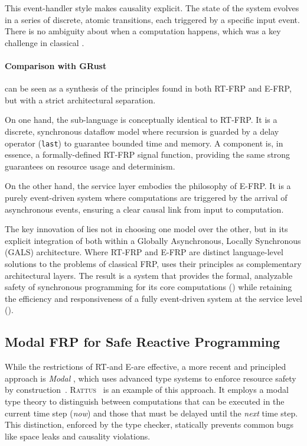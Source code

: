 This event-handler style makes causality explicit. The state of the system evolves in a series of
discrete, atomic transitions, each triggered by a specific input event. There is no ambiguity about
when a computation happens, which was a key challenge in classical \frp.

\paragraph*{Comparison with GRust}
\GRust can be seen as a synthesis of the principles found in both RT-FRP and E-FRP, but with a
strict architectural separation.

On one hand, the \GRSync sub-language is conceptually identical to RT-FRP. It is a discrete, synchronous
dataflow model where recursion is guarded by a delay operator (\texttt{last}) to guarantee bounded
time and memory. A \GRSync component is, in essence, a formally-defined RT-FRP signal function,
providing the same strong guarantees on resource usage and determinism.

On the other hand, the \GRFRP service layer embodies the philosophy of E-FRP. It is a purely
event-driven system where computations are triggered by the arrival of asynchronous events, ensuring
a clear causal link from input to computation.

The key innovation of \GRust lies not in choosing one model over the other, but in its explicit
integration of both within a Globally Asynchronous, Locally Synchronous (GALS) architecture. Where
RT-FRP and E-FRP are distinct language-level solutions to the problems of classical FRP, \GRust uses
their principles as complementary architectural layers. The result is a system that provides the
formal, analyzable safety of synchronous programming for its core computations (\GRSync) while
retaining the efficiency and responsiveness of a fully event-driven system at the service level
(\GRFRP).

\subsection{Modal FRP for Safe Reactive Programming}
\label{sec:sota:frp:modal}

While the restrictions of RT-\frp and E-\frp are effective, a more recent and principled approach is
\emph{Modal \frp}, which uses advanced type systems to enforce resource safety by
construction~\cite{DBLP:conf/icfp/Krishnaswami13,DBLP:conf/popl/KrishnaswamiBH12,DBLP:conf/sfp/DischHB25}.
\textsc{Rattus}~\cite{DBLP:journals/pacmpl/BahrGM19} is an example of this approach. It employs a
modal type theory to distinguish between computations that can be executed in the current time step
(\emph{now}) and those that must be delayed until the \emph{next} time step. This distinction,
enforced by the type checker, statically prevents common \frp bugs like space leaks and causality
violations.

